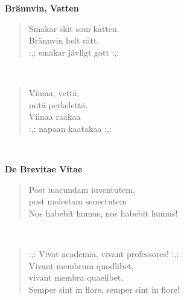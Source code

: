 %
%
\noindent\begin{minipage}{\linewidth}
\vspace{5pt}
\parbox[t]{0.85\linewidth}{\raggedright {\large\bf Brännvin, Vatten}\\[6pt]}
\begin{verse}
	Smakar skit som katten.\\
	Brännvin helt rått,\\
	\hspace{0pt-\widthof{:,: }}:,: smakar jävligt gott :,:\\
\end{verse}
\end{minipage}\\[10pt]
\noindent\begin{minipage}{\linewidth}
\begin{verse}
	Viinaa, vettä,\\
	mitä perkelettä.\\
	Viinaa raakaa\\
	\hspace{0pt-\widthof{:,: }}:,: napaan kaatakaa :,:\\
\end{verse}
\end{minipage}\\[10pt]
%
%
\noindent\begin{minipage}{\linewidth}
\vspace{5pt}
\parbox[t]{0.85\linewidth}{\raggedright {\large\bf De Brevitae Vitae}\\[6pt]}
\begin{verse}
	Post iuacundam iuventutem,\\
	post molestam senectutem\\
	Nos habebit humus, nos habebit humus!\\
\end{verse}
\end{minipage}\\[10pt]
\noindent\begin{minipage}{\linewidth}
\begin{verse}
	\hspace{0pt-\widthof{:,: }}:,: Vivat academia, vivant professores! :,:\\
	Vivant membrum quodlibet,\\
	vivant membra quaelibet,\\
	Semper sint in flore, semper sint in flore!\\
\end{verse}
\end{minipage}\\[10pt]
